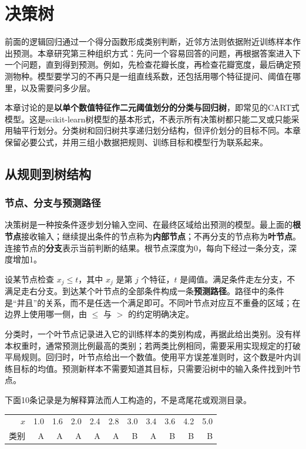 \chapter{决策树}
\label{chap:trees}

前面的逻辑回归通过一个得分函数形成类别判断，近邻方法则依据附近训练样本作出预测。本章研究第三种组织方式：先问一个容易回答的问题，再根据答案进入下一个问题，直到得到预测。例如，先检查花瓣长度，再检查花瓣宽度，最后确定预测物种。模型要学习的不再只是一组直线系数，还包括用哪个特征提问、阈值在哪里，以及需要问多少层。

本章讨论的是\textbf{以单个数值特征作二元阈值划分的分类与回归树}，即常见的CART式模型。这是scikit-learn树模型的基本形式，不表示所有决策树都只能二叉或只能采用轴平行划分。分类树和回归树共享递归划分结构，但评价划分的目标不同。本章保留必要公式，并用三组小数据把规则、训练目标和模型行为联系起来。

\section{从规则到树结构}
\subsection{节点、分支与预测路径}
决策树是一种按条件逐步划分输入空间、在最终区域给出预测的模型。最上面的\textbf{根节点}接收输入；继续提出条件的节点称为\textbf{内部节点}；不再分支的节点称为\textbf{叶节点}。连接节点的\textbf{分支}表示当前判断的结果。根节点深度为0，每向下经过一条分支，深度增加1。

设某节点检查 $x_j\leq t$，其中 $x_j$ 是第 $j$ 个特征，$t$ 是阈值。满足条件走左分支，不满足走右分支。到达某个叶节点的全部条件构成一条\textbf{预测路径}。路径中的条件是“并且”的关系，而不是任选一个满足即可。不同叶节点对应互不重叠的区域；在边界上使用哪一侧，由 $\leq$ 与 $>$ 的约定明确决定。

分类时，一个叶节点记录进入它的训练样本的类别构成，再据此给出类别。没有样本权重时，通常预测比例最高的类别；若两类比例相同，需要采用实现规定的打破平局规则。回归时，叶节点给出一个数值。使用平方误差准则时，这个数是叶内训练目标的均值。预测新样本不需要知道其目标，只需要沿树中的输入条件找到叶节点。

下面10条记录是为解释算法而人工构造的，不是鸢尾花或观测目录。
\begin{center}\small
\begin{tabular}{rrrrrrrrrrr}\toprule
$x$&1.0&1.6&2.0&2.4&2.8&3.0&3.4&3.6&4.2&5.0\\
类别& A&A&A&A&A&B&A&B&B&B\\\bottomrule
\end{tabular}\end{center}

